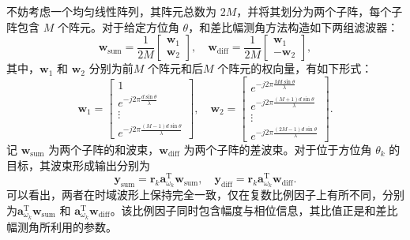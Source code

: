 不妨考虑一个均匀线性阵列，其阵元总数为 $2M$，并将其划分为两个子阵，每个子阵包含 $M$ 个阵元。对于给定方位角 $\theta$，和差比幅测角方法构造如下两组滤波器：
\[
    \bm{w}_{\text{sum}} = \frac{1}{2M}
    \begin{bmatrix}
        \bm{w}_1 \\
        \bm{w}_2
    \end{bmatrix}, \quad  \bm{w}_{\text{diff}} = \frac{1}{2M}
    \begin{bmatrix}
        \bm{w}_1 \\
        -\bm{w}_2
    \end{bmatrix},
\]
其中，\( \bm{w}_1 \) 和 \( \bm{w}_2 \) 分别为前\( M \) 个阵元和后\( M \) 个阵元的权向量，有如下形式：
\[
    \bm{w}_1 = \begin{bmatrix}
        1                                           \\
        e^{- j 2 \pi \frac{d \sin \theta}{\lambda}} \\
        \vdots                                      \\
        e^{- j 2 \pi \frac{(M-1) d \sin \theta}{\lambda}}
    \end{bmatrix}, \quad
    \bm{w}_2 = \begin{bmatrix}
        e^{- j 2 \pi \frac{M d \sin \theta}{\lambda}}     \\
        e^{- j 2 \pi \frac{(M+1) d \sin \theta}{\lambda}} \\
        \vdots                                            \\
        e^{- j 2 \pi \frac{(2M-1) d \sin \theta}{\lambda}}
    \end{bmatrix}.
\]
记 $\bm{w}_{\text{sum}}$ 为两个子阵的和波束，$\bm{w}_{\text{diff}}$ 为两个子阵的差波束。对于位于方位角 $\theta_k$ 的目标，其波束形成输出分别为
\[
    \bm{y}_{\text{sum}} =  \bm{r}_k \bm{a}_{\omega_k}^{\mathrm{T}} \bm{w}_{\text{sum}},
    \quad
    \bm{y}_{\text{diff}} = \bm{r}_k \bm{a}_{\omega_k}^{\mathrm{T}} \bm{w}_{\text{diff}}.
\]
可以看出，两者在时域波形上保持完全一致，仅在复数比例因子上有所不同，分别为$\bm{a}_{\omega_k}^{\mathrm{T}} \bm{w}_{\text{sum}}$ 和 $\bm{a}_{\omega_k}^{\mathrm{T}} \bm{w}_{\text{diff}}$。该比例因子同时包含幅度与相位信息，其比值正是和差比幅测角所利用的参数。

